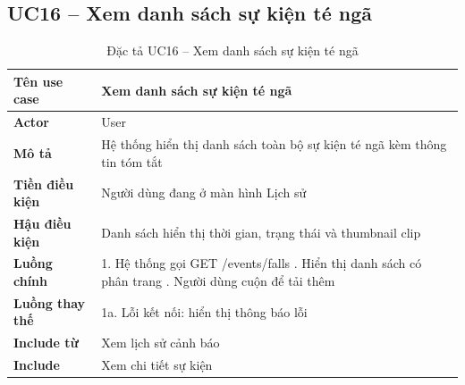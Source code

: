 \subsection*{UC16 -- Xem danh sách sự kiện té ngã}
\begin{table}[H]
    \captionsetup{justification=raggedright, singlelinecheck=false}
    \caption{Đặc tả UC16 -- Xem danh sách sự kiện té ngã}
\centering
\begin{tabular}{|p{3.5cm}|p{10cm}|}
\hline
\textbf{Tên use case} & Xem danh sách sự kiện té ngã \\
\hline
\textbf{Actor} & User \\
\hline
\textbf{Mô tả} & Hệ thống hiển thị danh sách toàn bộ
  sự kiện té ngã kèm thông tin tóm tắt \\
\hline
\textbf{Tiền điều kiện} & Người dùng đang ở màn hình
  Lịch sử \\
\hline
\textbf{Hậu điều kiện} & Danh sách hiển thị thời gian,
  trạng thái và thumbnail clip \\
\hline
\textbf{Luồng chính} &
  1. Hệ thống gọi GET /events/falls \newline
  2. Hiển thị danh sách có phân trang \newline
  3. Người dùng cuộn để tải thêm \\
\hline
\textbf{Luồng thay thế} &
  1a. Lỗi kết nối: hiển thị thông báo lỗi \\
\hline
\textbf{Include từ} & Xem lịch sử cảnh báo \\
\hline
\textbf{Include} & Xem chi tiết sự kiện \\
\hline
\end{tabular}

\end{table}


